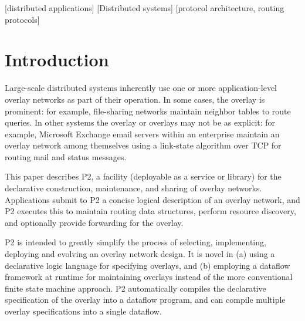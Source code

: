 \documentclass{sig-alt-full}
\def\Sys{P2\xspace}
\newcommand{\note}[1]{}
\begin{document}
[distributed applications]
[Distributed systems]
[protocol architecture, routing protocols]






\section{Introduction}
\label{sec:intro}
\note{Motivation: relevance.}
Large-scale distributed systems inherently use one or more
application-level overlay
networks as part of their operation.  In some cases, the overlay is
prominent: for example, file-sharing networks maintain neighbor tables
to route queries.  In other systems the overlay or overlays may
not be as explicit: for example, Microsoft Exchange email servers
within an enterprise maintain an overlay network among themselves
using a link-state algorithm over TCP for routing mail and status
messages.  


\note{What we will present.}
This paper describes \Sys, a facility (deployable as a service or
library) for the declarative construction, maintenance, and sharing of
overlay networks.  Applications submit to \Sys a concise logical
description of an overlay network, and \Sys executes this to maintain
routing data structures, perform resource discovery, and optionally
provide forwarding for the overlay.

\note{Technical Goals of the system (there are/were two).}
\Sys is intended to greatly
simplify the process of selecting, implementing, deploying and evolving an
overlay network design.  
It is novel in (a) using a declarative logic language for
specifying overlays, and (b) employing a dataflow framework at runtime
for maintaining overlays instead of the more conventional
finite state machine approach.  \Sys automatically compiles the
declarative specification of the overlay into a dataflow program, and
can compile multiple overlay specifications into a single dataflow.
\end{document}
